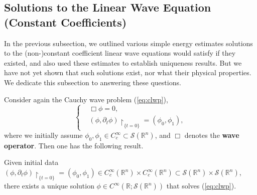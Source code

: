 \documentclass{article}
\begin{document}
\newpage 
\subsection{Solutions to the Linear Wave Equation (Constant Coefficients)} 
In the previous subsection, we outlined various simple energy estimates solutions to the (non-)constant coefficient linear wave equations would satisfy if they existed, and also used these estimates to establish uniqueness results. But we have not yet shown that such solutions exist, nor what their physical properties. We dedicate this subsection to answering these questions. 


Consider again the Cauchy wave problem (\ref{eq:clwp}), 
\begin{equation*}
	\left\{
	\begin{alignedat}{1}
		&\Box \phi = 0, \\
		&(\phi, \partial_{t}\phi)\upharpoonright_{\{t = 0\}} = (\phi_{0}, \phi_{1}), 
	\end{alignedat}
	\right.
\end{equation*}
where we initially assume $\phi_{0}, \phi_{1} \in C_{c}^{\infty} \subset \mathcal{S}(\mathbb{R}^{n})$, and $\Box$ denotes the \textbf{wave operator}. Then one has the following result. 

\begin{theorem}
	Given initial data $(\phi, \partial_{t}\phi)\upharpoonright_{\{t = 0\}} = (\phi_{0}, \phi_{1}) \in C_{c}^{\infty}(\mathbb{R}^{n}) \times C_{c}^{\infty}(\mathbb{R}^{n}) \subset \mathcal{S}(\mathbb{R}^{n}) \times \mathcal{S}(\mathbb{R}^{n})$, there exists a unique solution $\phi \in C^{\infty}(\mathbb{R}; \mathcal{S}(\mathbb{R}^{n}))$ that solves (\ref{eq:clwp}).
\end{theorem}
\end{document}
